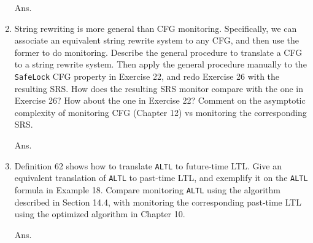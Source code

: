 \documentclass{article}
\begin{document}
\begin{enumerate}
Ans.


\item String rewriting is more general than CFG monitoring.
Specifically, we can associate an equivalent string rewrite system to any CFG,
and then use the former to do monitoring. 
Describe the general procedure to translate a CFG to a string rewrite system.
Then apply the general procedure manually to the \texttt{SafeLock} CFG property
in Exercise 22,
and redo Exercise 26 with the resulting SRS.
How does the resulting SRS monitor compare with the one in Exercise 26?
How about the one in Exercise 22?
Comment on the asymptotic complexity of monitoring CFG (Chapter 12) vs monitoring
the corresponding SRS.

Ans.


\newcommand{\ALTL}{\texttt{ALTL}\xspace}
\item Definition 62 shows how to translate \ALTL to future-time LTL.
Give an equivalent translation of \ALTL to past-time LTL,
and exemplify it on the \ALTL formula in Example 18.
Compare monitoring \ALTL using the algorithm described in Section 14.4,
with monitoring the corresponding past-time LTL using the optimized
algorithm in Chapter 10.

Ans.

\end{enumerate}
\end{document}

